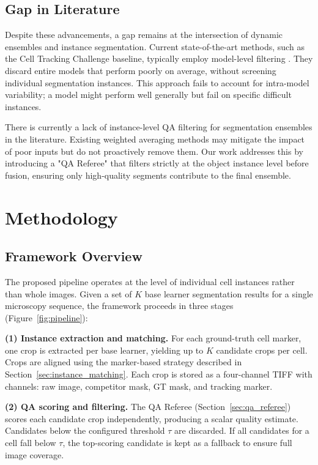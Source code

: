 \subsection{Gap in Literature}
Despite these advancements, a gap remains at the intersection of dynamic ensembles and instance
segmentation. Current state-of-the-art methods, such as the Cell Tracking Challenge baseline,
typically employ model-level filtering \cite{mavska2023cell}. They discard entire models that
perform poorly on average, without screening individual segmentation instances. This approach fails
to account for intra-model variability; a model might perform well generally but fail on specific
difficult instances.

There is currently a lack of instance-level QA filtering for segmentation ensembles in the
literature. Existing weighted averaging methods may mitigate the impact of poor inputs but do not
proactively remove them. Our work addresses this by introducing a "QA Referee" that filters
strictly at the object instance level before fusion, ensuring only high-quality segments contribute
to the final ensemble.


\section{Methodology} %
\label{sec:methodology}

\subsection{Framework Overview}

The proposed pipeline operates at the level of individual cell instances rather than whole images.
Given a set of $K$ base learner segmentation results for a single microscopy sequence, the
framework proceeds in three stages (Figure~\ref{fig:pipeline}):

\textbf{(1) Instance extraction and matching.} For each ground-truth cell marker, one crop is
extracted per base learner, yielding up to $K$ candidate crops per cell. Crops are aligned using
the marker-based strategy described in Section~\ref{sec:instance_matching}. Each crop is stored as
a four-channel TIFF with channels: raw image, competitor mask, GT mask, and tracking marker.

\textbf{(2) QA scoring and filtering.} The QA Referee (Section~\ref{sec:qa_referee}) scores each
candidate crop independently, producing a scalar quality estimate. Candidates below the configured
threshold $\tau$ are discarded. If all candidates for a cell fall below $\tau$, the top-scoring
candidate is kept as a fallback to ensure full image coverage.

